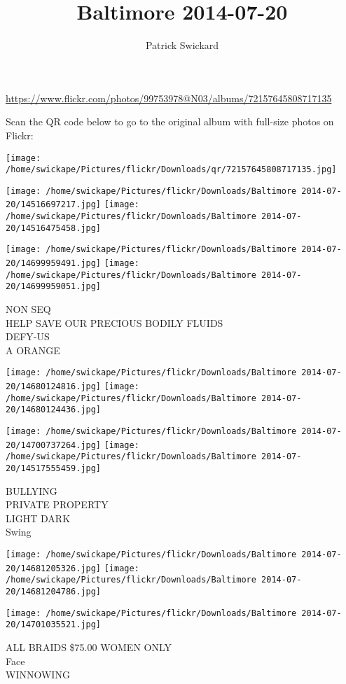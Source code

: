 \documentclass[10pt,letterpaper]{article}
\title{Baltimore 2014-07-20}
\author{Patrick Swickard}
\date{}
\begin{document}
\maketitle

\url{https://www.flickr.com/photos/99753978@N03/albums/72157645808717135}

Scan the QR code below to go to the original album with full-size photos on Flickr:

\texttt{[image: /home/swickape/Pictures/flickr/Downloads/qr/72157645808717135.jpg]}
\pagebreak

\texttt{[image: /home/swickape/Pictures/flickr/Downloads/Baltimore 2014-07-20/14516697217.jpg]}
\texttt{[image: /home/swickape/Pictures/flickr/Downloads/Baltimore 2014-07-20/14516475458.jpg]}

\texttt{[image: /home/swickape/Pictures/flickr/Downloads/Baltimore 2014-07-20/14699959491.jpg]}
\texttt{[image: /home/swickape/Pictures/flickr/Downloads/Baltimore 2014-07-20/14699959051.jpg]}

NON SEQ\\
HELP SAVE OUR PRECIOUS BODILY FLUIDS\\
DEFY{-}US\\
A ORANGE
\pagebreak

\texttt{[image: /home/swickape/Pictures/flickr/Downloads/Baltimore 2014-07-20/14680124816.jpg]}
\texttt{[image: /home/swickape/Pictures/flickr/Downloads/Baltimore 2014-07-20/14680124436.jpg]}

\texttt{[image: /home/swickape/Pictures/flickr/Downloads/Baltimore 2014-07-20/14700737264.jpg]}
\texttt{[image: /home/swickape/Pictures/flickr/Downloads/Baltimore 2014-07-20/14517555459.jpg]}

BULLYING\\
PRIVATE PROPERTY\\
LIGHT DARK\\
Swing
\pagebreak

\texttt{[image: /home/swickape/Pictures/flickr/Downloads/Baltimore 2014-07-20/14681205326.jpg]}
\texttt{[image: /home/swickape/Pictures/flickr/Downloads/Baltimore 2014-07-20/14681204786.jpg]}

\texttt{[image: /home/swickape/Pictures/flickr/Downloads/Baltimore 2014-07-20/14701035521.jpg]}

ALL BRAIDS \$75.00 WOMEN ONLY\\
Face\\
WINNOWING
\pagebreak
\end{document}
